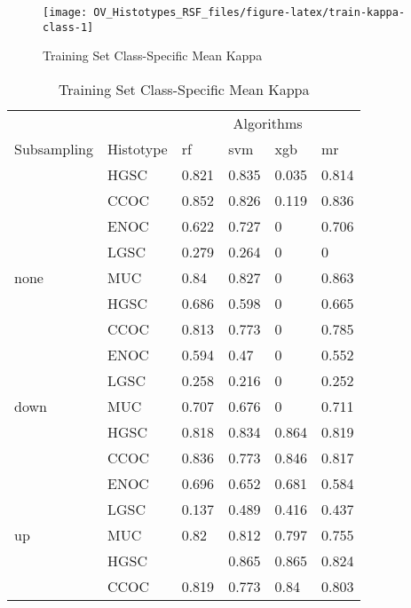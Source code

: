 \documentclass[
]{report}
\begin{document}
\begin{figure}[H]

{\centering \texttt{[image: OV\_Histotypes\_RSF\_files/figure-latex/train-kappa-class-1]} 

}

\caption{Training Set Class-Specific Mean Kappa}\label{fig:train-kappa-class}
\end{figure}

\begin{table}

\caption{\label{tab:train-kappa-class-table}Training Set Class-Specific Mean Kappa}
\centering
\begin{tabular}[t]{l|l|l|l|l|l}
\hline
\multicolumn{2}{c|}{ } & \multicolumn{4}{c}{Algorithms} \\
\cline{3-6}
Subsampling & Histotype & rf & svm & xgb & mr\\
\hline
 & HGSC & 0.821 & 0.835 & 0.035 & 0.814\\
\cline{2-6}
 & CCOC & 0.852 & 0.826 & 0.119 & 0.836\\
\cline{2-6}
 & ENOC & 0.622 & 0.727 & 0 & 0.706\\
\cline{2-6}
 & LGSC & 0.279 & 0.264 & 0 & 0\\
\cline{2-6}
\multirow{-5}{*}{\raggedright\arraybackslash none} & MUC & 0.84 & 0.827 & 0 & 0.863\\
\cline{1-6}
 & HGSC & 0.686 & 0.598 & 0 & 0.665\\
\cline{2-6}
 & CCOC & 0.813 & 0.773 & 0 & 0.785\\
\cline{2-6}
 & ENOC & 0.594 & 0.47 & 0 & 0.552\\
\cline{2-6}
 & LGSC & 0.258 & 0.216 & 0 & 0.252\\
\cline{2-6}
\multirow{-5}{*}{\raggedright\arraybackslash down} & MUC & 0.707 & 0.676 & 0 & 0.711\\
\cline{1-6}
 & HGSC & 0.818 & 0.834 & 0.864 & 0.819\\
\cline{2-6}
 & CCOC & 0.836 & 0.773 & 0.846 & 0.817\\
\cline{2-6}
 & ENOC & 0.696 & 0.652 & 0.681 & 0.584\\
\cline{2-6}
 & LGSC & 0.137 & 0.489 & 0.416 & 0.437\\
\cline{2-6}
\multirow{-5}{*}{\raggedright\arraybackslash up} & MUC & 0.82 & 0.812 & 0.797 & 0.755\\
\cline{1-6}
 & HGSC & \cellcolor[HTML]{90ee90}{0.875} & 0.865 & 0.865 & 0.824\\
\cline{2-6}
 & CCOC & 0.819 & 0.773 & 0.84 & 0.803\\

\end{tabular}
\end{table}
\end{document}
